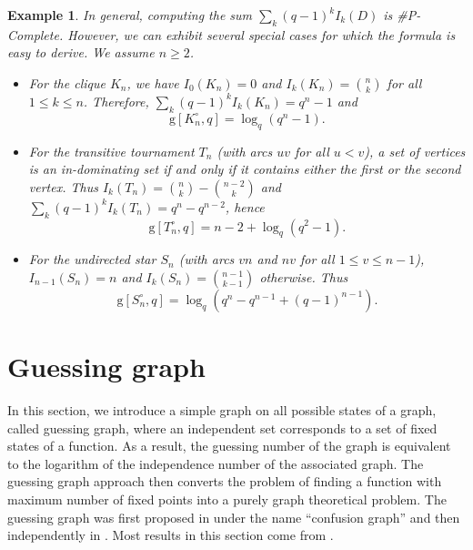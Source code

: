 \documentclass[a4paper, 11pt]{book}
\numberwithin{equation}{section}
\theoremstyle{plain}
\newtheorem{example}	[equation]	{Example}
\newcommand{\loopfull}[1]{{#1^\circ}}
\newcommand{\guessing}{\mathrm{g}}
\renewcommand{\(}{\ldbrack}
\renewcommand{\)}{\rdbrack}
\begin{document}
\begin{example} \label{ex:g_strict_loops}
In general, computing the sum $\sum_k (q-1)^k I_k(D)$ is \#P-Complete. However, we can exhibit several special cases for which the formula is easy to derive. We assume $n \ge 2$.
\begin{itemize}
	\item For the clique $K_n$, we have $I_0(K_n) = 0$ and $I_k(K_n) = \binom{n}{k}$ for all $1 \le k \le n$. Therefore, $\sum_k (q-1)^k I_k(K_n) = q^n - 1$ and
	\[
		\guessing[\loopfull{K_n}, q] = \log_q( q^n - 1 ).
	\]
	
	\item For the transitive tournament $T_n$ (with arcs $uv$ for all $u < v$), a set of vertices is an in-dominating set if and only if it contains either the first or the second vertex. Thus $I_k(T_n) = \binom{n}{k} - \binom{n-2}{k}$ and $\sum_k (q-1)^k I_k(T_n) = q^n - q^{n-2}$, hence
	\[
		\guessing[\loopfull{T_n}, q] = n-2 + \log_q(q^2-1).
	\]
		
	\item For the undirected star $S_n$ (with arcs $vn$ and $nv$ for all $1 \le v \le n-1$), $I_{n-1}(S_n) = n$ and $I_k(S_n) = \binom{n-1}{k-1}$ otherwise. Thus
	\[
		\guessing[\loopfull{S_n}, q] = \log_q( q^n - q^{n-1} + (q-1)^{n-1} ).
	\]
\end{itemize}
\end{example}












\section{Guessing graph} \label{sec:guessing_graph}

In this section, we introduce a simple graph on all possible states of a graph, called guessing graph, where an independent set corresponds to a set of fixed states of a function. As a result, the guessing number of the graph is equivalent to the logarithm of the independence number of the associated graph. The guessing graph approach then converts the problem of finding a function with maximum number of fixed points into a purely graph theoretical problem. The guessing graph was first proposed in \cite{BBJK06} under the name ``confusion graph'' and then independently in \cite{GR11}. Most results in this section come from \cite{GR11}.
\end{document}
